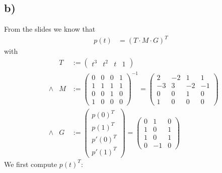 \documentclass{article}
\begin{document}
\newpage
    \subsection*{b)}
        From the slides we know that
        \begin{align}
            p(t) &= (T \cdot M \cdot G)^T
        \end{align}
        with
        \begin{align}
            & &T &:= \left(\begin{matrix} t^3 & t^2 & t & 1 \end{matrix}\right)\\
            &\wedge
            &M &:= \left(\begin{matrix} 0&0&0&1 \\ 1&1&1&1 \\0&0&1&0 \\ 1&0&0&0 \end{matrix}\right)^{-1} 
                = \left(\begin{matrix} 2&-2&1&1 \\ -3&3&-2&-1 \\ 0&0&1&0 \\ 1&0&0&0 \end{matrix}\right)\\
            &\wedge 
            &G &:= \left(\begin{matrix} p(0)^T \\ p(1)^T \\ p'(0)^T \\ p'(1)^T \end{matrix}\right)
                = \left(\begin{matrix} 0&1&0 \\ 1&0&1 \\ 1&0&1 \\ 0&-1&0 \end{matrix}\right)
        \end{align}
        We first compute $p(t)^T$:
\end{document}
